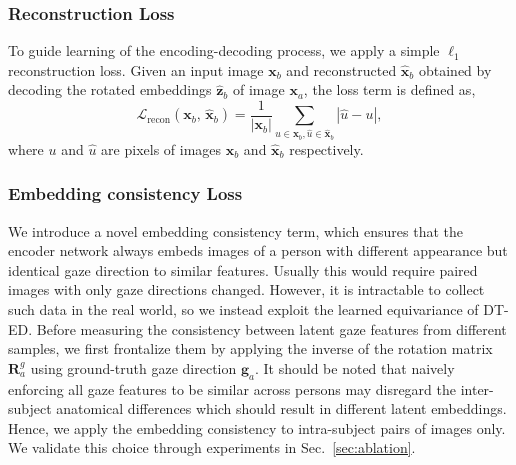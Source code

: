 \documentclass[10pt,twocolumn,letterpaper]{article}
\begin{document}
\subsubsection{Reconstruction Loss}
To guide learning of the encoding-decoding process, we apply a simple $\ell_1$ reconstruction loss.
Given an input image $\mathbf{x}_b$ and reconstructed $\hat{\mathbf{x}}_b$ obtained by decoding the rotated embeddings $\hat{\mathbf{z}}_b$ of image $\mathbf{x}_a$, the loss term is defined as,
\begin{equation}
    \mathcal{L}_\mathrm{recon}\left(
    \mathbf{x}_b,\,
    \hat{\mathbf{x}}_b
    \right)
    =
    \frac{1}{|\mathbf{x}_b|}
    \sum_{u\in\mathbf{x}_b,\hat{u}\in\hat{\mathbf{x}}_b}
    \left|
        \hat{u} - u
    \right|,
    \label{eq:l1_loss}
\end{equation}
where $u$ and $\hat{u}$ are pixels of images $\mathbf{x}_b$ and $\hat{\mathbf{x}}_b$ respectively.


\subsubsection{Embedding consistency Loss}
\label{sec:embedding consistency}

We introduce a novel embedding consistency term, which ensures that the encoder network always embeds images of a person with different appearance but identical gaze direction to similar features. 
Usually this would require paired images with only gaze directions changed. However, it is intractable to collect such data in the real world, so we instead exploit
the learned equivariance of DT-ED.
Before measuring the consistency between latent gaze features from different samples, we first frontalize them by applying the inverse of the rotation matrix $\mathbf{R}^g_a$ using ground-truth gaze direction $\mathbf{g}_a$. It should be noted that naively enforcing all gaze features to be similar across persons may disregard the inter-subject anatomical differences which should result in different latent embeddings. Hence, we apply the embedding consistency to intra-subject pairs of images only. 
We validate this choice through experiments in Sec.~\ref{sec:ablation}.
\end{document}
